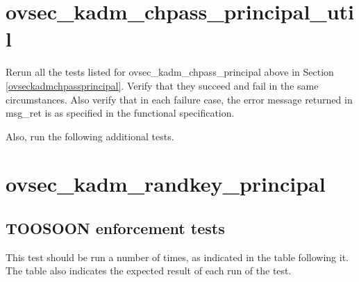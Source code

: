 {%





\section{ovsec_kadm_chpass_principal_util}

Rerun all the tests listed for ovsec_kadm_chpass_principal above in
Section \ref{ovseckadmchpassprincipal}.  Verify that they succeed
and fail in the same circumstances.  Also verify that in each failure
case, the error message returned in msg_ret is as specified in the
functional specification.

Also, run the following additional tests.







\section{ovsec_kadm_randkey_principal}

\subsection{TOOSOON enforcement tests}

This test should be run a number of times, as indicated in the table
following it.  The table also indicates the expected result of each
run of the test.

}
